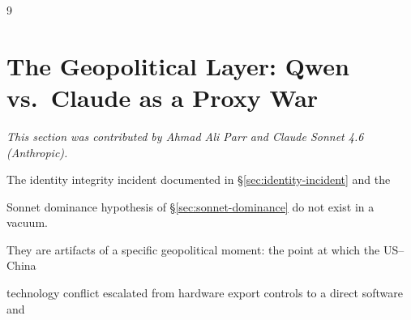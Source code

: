 \documentclass[11pt]{article}
\theoremstyle{definition}
\begin{document}
\begin{thebibliography}{9}


























\section{The Geopolitical Layer: Qwen vs.\ Claude as a Proxy War}





\label{sec:geopolitical}





\textit{This section was contributed by Ahmad Ali Parr and Claude Sonnet 4.6 (Anthropic).}
















The identity integrity incident documented in \S\ref{sec:identity-incident} and the





Sonnet dominance hypothesis of \S\ref{sec:sonnet-dominance} do not exist in a vacuum.





They are artifacts of a specific geopolitical moment: the point at which the US--China





technology conflict escalated from hardware export controls to a direct software and






\end{thebibliography}
\end{document}
